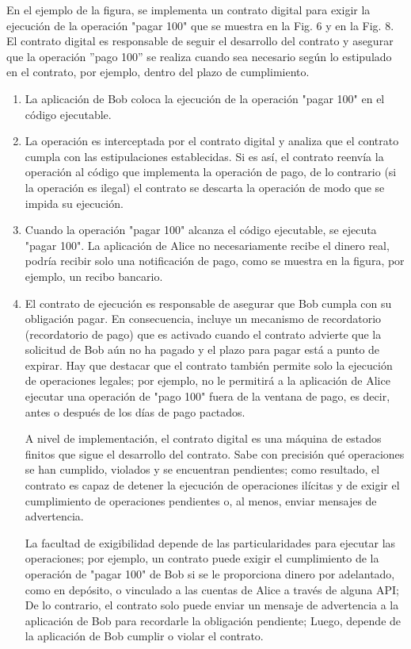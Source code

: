 \documentclass[12pt]{report} %
\begin{document}
\begin{itemize}
\begin{enumerate}
En el ejemplo de la figura, se implementa un contrato digital para exigir la ejecución de la operación "pagar 100" que se muestra en la Fig. 6 y en la Fig. 8. El contrato digital es responsable de seguir el desarrollo del contrato y asegurar que la operación ”pago 100” se realiza cuando sea necesario según lo estipulado en el contrato, por ejemplo, dentro del plazo de cumplimiento.

\begin{enumerate}
    \item La aplicación de Bob coloca la ejecución de la operación "pagar 100" en el código ejecutable.

    \item La operación es interceptada por el contrato digital y analiza que el contrato cumpla con las estipulaciones establecidas. Si es así, el contrato reenvía la operación al código que implementa la operación de pago, de lo contrario (si la operación es ilegal) el contrato se descarta la operación de modo que se impida su ejecución.

    \item Cuando la operación "pagar 100" alcanza el código ejecutable, se ejecuta "pagar 100". La aplicación de Alice no necesariamente recibe el dinero real, podría recibir solo una notificación de pago, como se muestra en la figura, por ejemplo, un recibo bancario.

    \item El contrato de ejecución es responsable de asegurar que Bob cumpla con su obligación pagar. En consecuencia, incluye un mecanismo de recordatorio (recordatorio de pago) que es activado cuando el contrato advierte que la solicitud de Bob aún no ha pagado y el plazo para pagar está a punto de expirar. Hay que destacar que el contrato también permite solo la ejecución  de operaciones legales; por ejemplo, no le permitirá a la aplicación de Alice ejecutar una operación de "pago 100" fuera de la ventana de pago, es decir, antes o después de los días de pago pactados.

    A nivel de implementación, el contrato digital es una máquina de estados finitos que sigue el desarrollo del contrato. Sabe con precisión qué operaciones se han cumplido, violados y se encuentran pendientes; como resultado, el contrato es capaz de detener la ejecución de operaciones ilícitas y de exigir el cumplimiento de operaciones pendientes o, al menos, enviar mensajes de advertencia.

    La facultad de exigibilidad depende de las particularidades para ejecutar las operaciones; por ejemplo, un contrato puede exigir el cumplimiento de la operación de "pagar 100" de Bob si se le proporciona dinero por adelantado, como en depósito, o vinculado a las cuentas de Alice a través de alguna API; De lo contrario, el contrato solo puede enviar un mensaje de advertencia a la aplicación de Bob para recordarle la obligación pendiente; Luego, depende de la aplicación de Bob cumplir o violar el contrato.


\end{enumerate}
\end{enumerate}
\end{itemize}
\end{document}
